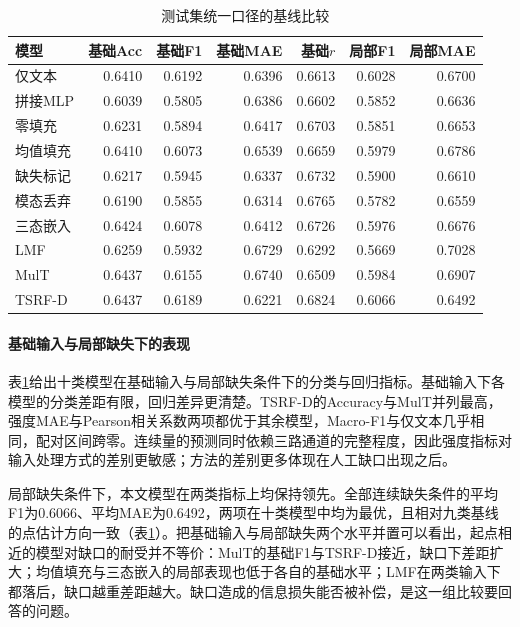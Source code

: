 \begin{table}[htbp]\centering\small
\caption{测试集统一口径的基线比较}\label{q2:tab:baseline}
\begin{tabular}{lrrrrrr}\toprule
模型 & 基础Acc & 基础F1 & 基础MAE & 基础$r$ & 局部F1 & 局部MAE\\\midrule
仅文本 & 0.6410 & 0.6192 & 0.6396 & 0.6613 & 0.6028 & 0.6700\\
拼接MLP & 0.6039 & 0.5805 & 0.6386 & 0.6602 & 0.5852 & 0.6636\\
零填充 & 0.6231 & 0.5894 & 0.6417 & 0.6703 & 0.5851 & 0.6653\\
均值填充 & 0.6410 & 0.6073 & 0.6539 & 0.6659 & 0.5979 & 0.6786\\
缺失标记 & 0.6217 & 0.5945 & 0.6337 & 0.6732 & 0.5900 & 0.6610\\
模态丢弃 & 0.6190 & 0.5855 & 0.6314 & 0.6765 & 0.5782 & 0.6559\\
三态嵌入 & 0.6424 & 0.6078 & 0.6412 & 0.6726 & 0.5976 & 0.6676\\
LMF & 0.6259 & 0.5932 & 0.6729 & 0.6292 & 0.5669 & 0.7028\\
MulT & 0.6437 & 0.6155 & 0.6740 & 0.6509 & 0.5984 & 0.6907\\
TSRF-D & 0.6437 & 0.6189 & 0.6221 & 0.6824 & 0.6066 & 0.6492\\
\bottomrule\end{tabular}\end{table}

\paragraph{基础输入与局部缺失下的表现}
表\ref{q2:tab:baseline}给出十类模型在基础输入与局部缺失条件下的分类与回归指标。基础输入下各模型的分类差距有限，回归差异更清楚。TSRF-D的Accuracy与MulT并列最高，强度MAE与Pearson相关系数两项都优于其余模型，Macro-F1与仅文本几乎相同，配对区间跨零。连续量的预测同时依赖三路通道的完整程度，因此强度指标对输入处理方式的差别更敏感；方法的差别更多体现在人工缺口出现之后。

局部缺失条件下，本文模型在两类指标上均保持领先。全部连续缺失条件的平均F1为0.6066、平均MAE为0.6492，两项在十类模型中均为最优，且相对九类基线的点估计方向一致（表\ref{q2:tab:baseline}）。把基础输入与局部缺失两个水平并置可以看出，起点相近的模型对缺口的耐受并不等价：MulT的基础F1与TSRF-D接近，缺口下差距扩大；均值填充与三态嵌入的局部表现也低于各自的基础水平；LMF在两类输入下都落后，缺口越重差距越大。缺口造成的信息损失能否被补偿，是这一组比较要回答的问题。


